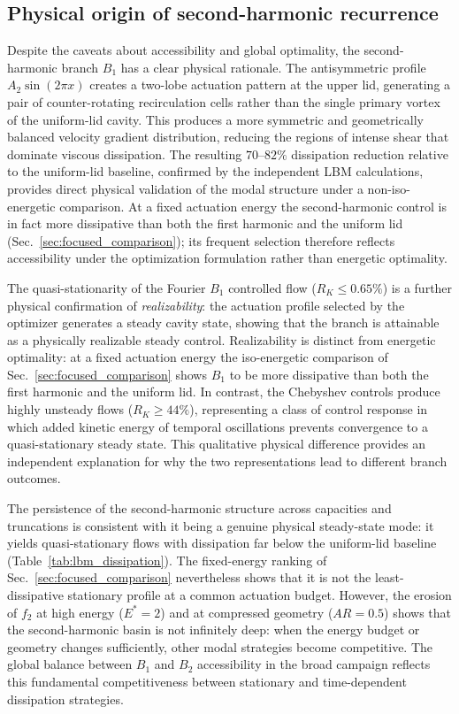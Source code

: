 \documentclass[a4paper,11pt]{article}
\begin{document}
\subsection{Physical origin of second-harmonic recurrence}

Despite the caveats about accessibility and global optimality, the second-harmonic
branch \(B_1\) has a clear physical rationale. The antisymmetric profile
\(A_2\sin(2\pi x)\) creates a two-lobe actuation pattern at the upper lid,
generating a pair of counter-rotating recirculation cells rather than the single
primary vortex of the uniform-lid cavity. This produces a more symmetric and
geometrically balanced velocity gradient distribution, reducing the regions of
intense shear that dominate viscous dissipation. The resulting \(70\)--\(82\%\)
dissipation reduction relative to the uniform-lid baseline, confirmed by the
independent LBM calculations, provides direct physical validation of the modal
structure under a non-iso-energetic comparison. At a fixed actuation energy the
second-harmonic control is in fact more dissipative than both the first harmonic
and the uniform lid (Sec.~\ref{sec:focused_comparison}); its frequent selection
therefore reflects accessibility under the optimization formulation rather than
energetic optimality.

The quasi-stationarity of the Fourier \(B_1\) controlled flow (\(R_K\le0.65\%\))
is a further physical confirmation of \emph{realizability}: the actuation profile
selected by the optimizer generates a steady cavity state, showing that the branch
is attainable as a physically realizable steady control. Realizability is distinct
from energetic optimality: at a fixed actuation energy the iso-energetic comparison
of Sec.~\ref{sec:focused_comparison} shows \(B_1\) to be more dissipative than both
the first harmonic and the uniform lid. In contrast, the Chebyshev controls produce
highly unsteady flows (\(R_K\ge44\%\)), representing a class of control response in
which added kinetic energy of temporal oscillations prevents convergence to a
quasi-stationary steady state. This qualitative physical difference
provides an independent explanation for why the two representations lead to
different branch outcomes.

The persistence of the second-harmonic structure across capacities and truncations
is consistent with it being a genuine physical steady-state mode: it yields
quasi-stationary flows with dissipation far below the uniform-lid baseline
(Table~\ref{tab:lbm_dissipation}). The fixed-energy ranking of
Sec.~\ref{sec:focused_comparison} nevertheless shows that it is not the
least-dissipative stationary profile at a common actuation budget. However,
the erosion of \(f_2\) at high energy (\(E^*=2\)) and at compressed geometry
(\(AR=0.5\)) shows that the second-harmonic basin is not infinitely deep: when
the energy budget or geometry changes sufficiently, other modal strategies become
competitive. The global balance between \(B_1\) and \(B_2\) accessibility in the
broad campaign reflects this fundamental competitiveness between stationary and
time-dependent dissipation strategies.
\end{document}
